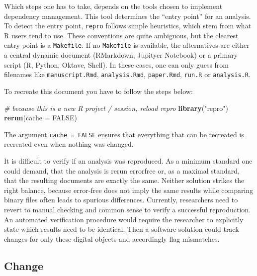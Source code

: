 \documentclass[12pt,a4paper,]{article}
\newenvironment{Shaded}{\begin{snugshade}}{\end{snugshade}}
\newcommand{\CommentTok}[1]{\textcolor[rgb]{0.56,0.35,0.01}{\textit{#1}}}
\newcommand{\DataTypeTok}[1]{\textcolor[rgb]{0.13,0.29,0.53}{#1}}
\newcommand{\KeywordTok}[1]{\textcolor[rgb]{0.13,0.29,0.53}{\textbf{#1}}}
\newcommand{\NormalTok}[1]{#1}
\newcommand{\OtherTok}[1]{\textcolor[rgb]{0.56,0.35,0.01}{#1}}
\newcommand{\StringTok}[1]{\textcolor[rgb]{0.31,0.60,0.02}{#1}}
\begin{document}
Which steps one has to take, depends on the tools chosen to implement dependency management.
This tool determines the ``entry point'' for an analysis.
To detect the entry point, \texttt{repro} follows simple heuristics, which stem from what R users tend to use.
These conventions are quite ambiguous, but the clearest entry point is a \texttt{Makefile}.
If no \texttt{Makefile} is available, the alternatives are either a central dynamic document (RMarkdown, Jupityer Notebook) or a primary script (R, Python, Oktave, Shell).
In these cases, one can only guess from filenames like \texttt{manuscript.Rmd}, \texttt{analysis.Rmd}, \texttt{paper.Rmd}, \texttt{run.R} or \texttt{analysis.R}.

To recreate this document you have to follow the steps below:

\begin{Shaded}
\begin{Highlighting}[]
\CommentTok{# because this is a new R project / session, reload repro}
\KeywordTok{library}\NormalTok{(}\StringTok{"repro"}\NormalTok{)}
\KeywordTok{rerun}\NormalTok{(}\DataTypeTok{cache =} \OtherTok{FALSE}\NormalTok{)}
\end{Highlighting}
\end{Shaded}

The argument \texttt{cache\ =\ FALSE} ensures that everything that can be recreated is recreated even when nothing was changed.

It is difficult to verify if an analysis was reproduced.
As a minimum standard one could demand, that the analysis is rerun errorfree or, as a maximal standard, that the resulting documents are exactly the same.
Neither solution strikes the right balance, because error-free does not imply the same results while comparing binary files often leads to spurious differences.
Currently, researchers need to revert to manual checking and common sense to verify a successful reproduction.
An automated verification procedure would require the researcher to explicitly state which results need to be identical.
Then a software solution could track changes for only these digital objects and accordingly flag mismatches.

\hypertarget{change}{%
\subsection{Change}\label{change}}
\end{document}
